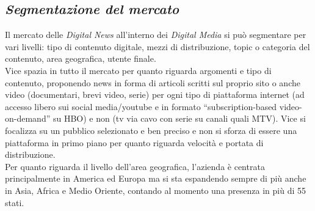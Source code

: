\documentclass[a4paper, 11pt]{article}
\begin{document}
\subsection*{\textit{Segmentazione del mercato}}
\par Il mercato delle \textit{Digital News} all'interno dei \textit{Digital Media} si può segmentare per vari livelli: tipo di contenuto digitale, mezzi di distribuzione, topic o categoria del contenuto, area geografica, utente finale.\\
Vice spazia in tutto il mercato per quanto riguarda argomenti e tipo di contenuto, proponendo news in forma di articoli scritti sul proprio sito o anche video (documentari, brevi video, serie) per ogni tipo di piattaforma internet (ad accesso libero sui social media/youtube e in formato “subscription-based video-on-demand” su HBO) e non (tv via cavo con serie su canali quali MTV).
Vice si focalizza su un pubblico selezionato e ben preciso e non si sforza di essere una piattaforma in primo piano per quanto riguarda velocità e portata di distribuzione.\\
Per quanto riguarda il livello dell’area geografica, l’azienda è centrata principalmente in America ed Europa ma si sta espandendo sempre di più anche in Asia, Africa e Medio Oriente, contando al momento una presenza in più di 55 stati.
\end{document}

